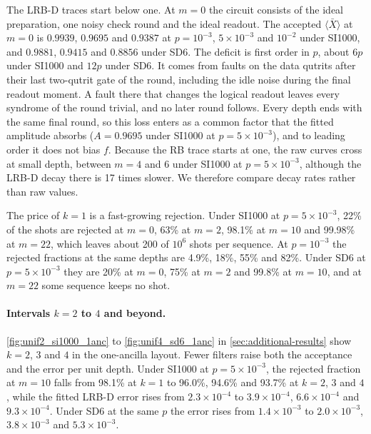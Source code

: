 The LRB-D traces start below one. At $m = 0$ the circuit consists of the ideal preparation, one noisy check round and the ideal readout. The accepted $\langle \bar{X} \rangle$ at $m = 0$ is $0.9939$, $0.9695$ and $0.9387$ at $p = 10^{-3}$, $5\times10^{-3}$ and $10^{-2}$ under SI1000, and $0.9881$, $0.9415$ and $0.8856$ under SD6. The deficit is first order in $p$, about $6p$ under SI1000 and $12p$ under SD6. It comes from faults on the data qutrits after their last two-qutrit gate of the round, including the idle noise during the final readout moment. A fault there that changes the logical readout leaves every syndrome of the round trivial, and no later round follows. Every depth ends with the same final round, so this loss enters as a common factor that the fitted amplitude absorbs ($A = 0.9695$ under SI1000 at $p = 5\times10^{-3}$), and to leading order it does not bias $f$. Because the RB trace starts at one, the raw curves cross at small depth, between $m = 4$ and $6$ under SI1000 at $p = 5\times10^{-3}$, although the LRB-D decay there is 17 times slower. We therefore compare decay rates rather than raw values.

The price of $k = 1$ is a fast-growing rejection. Under SI1000 at $p = 5\times10^{-3}$, 22\% of the shots are rejected at $m = 0$, 63\% at $m = 2$, 98.1\% at $m = 10$ and 99.98\% at $m = 22$, which leaves about 200 of $10^6$ shots per sequence. At $p = 10^{-3}$ the rejected fractions at the same depths are 4.9\%, 18\%, 55\% and 82\%. Under SD6 at $p = 5\times10^{-3}$ they are 20\% at $m = 0$, 75\% at $m = 2$ and 99.8\% at $m = 10$, and at $m = 22$ some sequence keeps no shot.

\paragraph{Intervals $k = 2$ to $4$ and beyond.}
\autoref{fig:unif2_si1000_1anc} to \autoref{fig:unif4_sd6_1anc} in \autoref{sec:additional-results} show $k = 2$, $3$ and $4$ in the one-ancilla layout. Fewer filters raise both the acceptance and the error per unit depth. Under SI1000 at $p = 5\times10^{-3}$, the rejected fraction at $m = 10$ falls from 98.1\% at $k = 1$ to 96.0\%, 94.6\% and 93.7\% at $k = 2$, $3$ and $4$, while the fitted LRB-D error rises from $2.3\times10^{-4}$ to $3.9\times10^{-4}$, $6.6\times10^{-4}$ and $9.3\times10^{-4}$. Under SD6 at the same $p$ the error rises from $1.4\times10^{-3}$ to $2.0\times10^{-3}$, $3.8\times10^{-3}$ and $5.3\times10^{-3}$.

